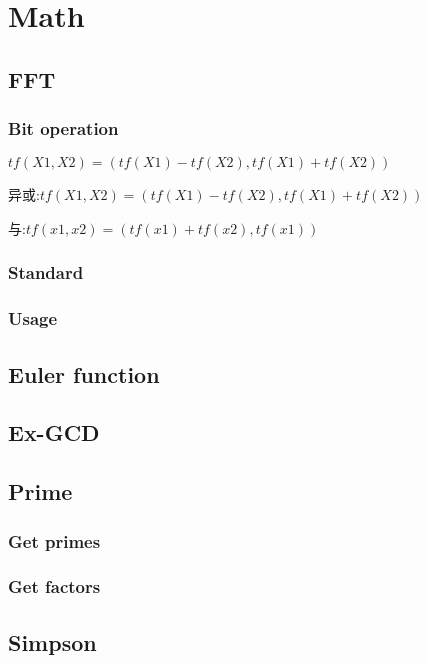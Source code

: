 \section{Math}
\subsection{FFT}
\subsubsection{Bit operation}
$tf(X1,X2) = (tf(X1) - tf(X2), tf(X1) + tf(X2))$

异或:$tf(X1,X2) = (tf(X1) - tf(X2), tf(X1) + tf(X2))$ 

与:$tf(x1,x2)=(tf(x1) + tf(x2), tf(x1))$

\subsubsection{Standard}

\subsubsection{Usage}


\subsection{Euler function}


\subsection{Ex-GCD}


\subsection{Prime}
\subsubsection{Get primes}

\subsubsection{Get factors}


\subsection{Simpson}


